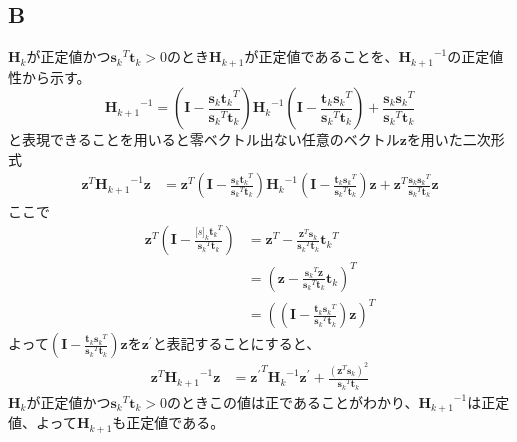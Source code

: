 \documentclass[10pt,a4paper]{ltjsarticle}       %
\begin{document}
    \subsection{B}
    $\bm{H}_k$が正定値かつ${\bm{s}_k}^T\bm{t}_k >0$のとき$\bm{H}_{k+1}$が正定値であることを、${\bm{H}_{k+1}}^{-1}$の正定値性から示す。
    \begin{equation}
    {\bm{H}_{k+1}}^{-1} = \left( \bm{I} - \frac{\bm{s}_k{\bm{t}_k}^T}{{\bm{s}_k}^T\bm{t}_k} \right) {\bm{H}_k}^{-1} \left( \bm{I} - \frac{\bm{t}_k{\bm{s}_k}^T}{{\bm{s}_k}^T\bm{t}_k} \right) + \frac{\bm{s}_k{\bm{s}_k}^T}{{\bm{s}_k}^T\bm{t}_k}
    \end{equation}
    と表現できることを用いると零ベクトル出ない任意のベクトル$\bm{z}$を用いた二次形式
    \begin{align}
    \bm{z}^T {\bm{H}_{k+1}}^{-1} \bm{z} &= \bm{z}^T  \left( 
      \bm{I} - \frac{\bm{s}_k{\bm{t}_k}^T}{{\bm{s}_k}^T\bm{t}_k} 
    \right) {\bm{H}_k}^{-1} \left( 
      \bm{I} - \frac{\bm{t}_k{\bm{s}_k}^T}{{\bm{s}_k}^T\bm{t}_k} 
    \right)\bm{z} + \bm{z}^T \frac{\bm{s}_k{\bm{s}_k}^T}{{\bm{s}_k}^T\bm{t}_k} \bm{z}
    \end{align}
    ここで
    \begin{align}
    \bm{z}^T \left( \bm{I} - \frac{\bm[s]_k{\bm{t}_k}^T}{{\bm{s}_k}^T\bm{t}_k} \right) &= \bm{z}^T - \frac{{\bm{z}}^T\bm{s}_k}{{\bm{s}_k}^T\bm{t}_k} {\bm{t}_k}^T \\
    &= \left( \bm{z} - \frac{{\bm{s}_k}^T\bm{z}}{{\bm{s}_k}^T\bm{t}_k} \bm{t}_k \right)^T \\
    &= \left(  \left( \bm{I} - \frac{\bm{t}_k{\bm{s}_k}^T}{{\bm{s}_k}^T\bm{t}_k} \right) \bm{z} \right)^T
    \end{align}
    よって$\left( \bm{I} - \frac{\bm{t}_k{\bm{s}_k}^T}{{\bm{s}_k}^T\bm{t}_k} \right) \bm{z}$を$\bm{z}^{\prime}$と表記することにすると、
    \begin{align}
    \bm{z}^T {\bm{H}_{k+1}}^{-1} \bm{z} &= {\bm{z}^{\prime}}^T {\bm{H}_{k}}^{-1} \bm{z}^{\prime} + \frac{\left( {\bm{z}}^T\bm{s}_k \right)^2}{ {\bm{s}_k}^T\bm{t}_k }
    \end{align}
    $\bm{H}_k$が正定値かつ${\bm{s}_k}^T\bm{t}_k >0$のときこの値は正であることがわかり、${\bm{H}_{k+1}}^{-1}$は正定値、よって$\bm{H}_{k+1}$も正定値である。
    
\end{document}
